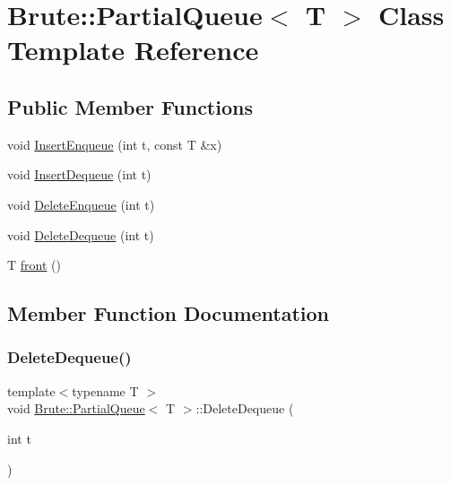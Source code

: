 \hypertarget{classBrute_1_1PartialQueue}{}\section{Brute\+:\+:Partial\+Queue$<$ T $>$ Class Template Reference}
\label{classBrute_1_1PartialQueue}
\subsection*{Public Member Functions}
\begin{DoxyCompactItemize}
\item 
void \hyperlink{classBrute_1_1PartialQueue_adaa00384721f3801ede6ecc7a7203100}{Insert\+Enqueue} (int t, const T \&x)
\item 
void \hyperlink{classBrute_1_1PartialQueue_a9c5a4ffa1216d759f6339d2f56983618}{Insert\+Dequeue} (int t)
\item 
void \hyperlink{classBrute_1_1PartialQueue_a4541c69cc2624fb28ffadd1f1cfc84e9}{Delete\+Enqueue} (int t)
\item 
void \hyperlink{classBrute_1_1PartialQueue_ab3dbd1645e133e8e01297ce0265dfac8}{Delete\+Dequeue} (int t)
\item 
T \hyperlink{classBrute_1_1PartialQueue_ab90169266f018db61fa665d8cfba2e85}{front} ()
\end{DoxyCompactItemize}


\subsection{Member Function Documentation}
\mbox{\label{classBrute_1_1PartialQueue_ab3dbd1645e133e8e01297ce0265dfac8}} 
\subsubsection{\texorpdfstring{Delete\+Dequeue()}{DeleteDequeue()}}
{\footnotesize\ttfamily template$<$typename T $>$ \\
void \hyperlink{classBrute_1_1PartialQueue}{Brute\+::\+Partial\+Queue}$<$ T $>$\+::Delete\+Dequeue (\begin{DoxyParamCaption}\item[{int}]{t }\end{DoxyParamCaption})}

